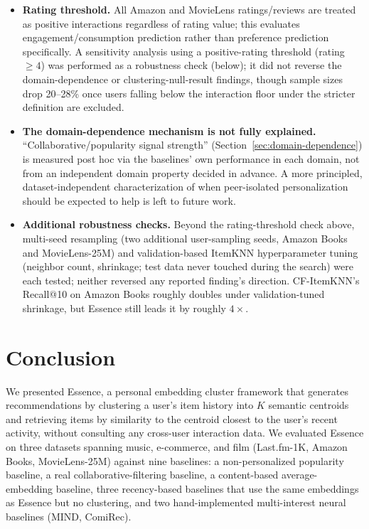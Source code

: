 \documentclass[11pt,a4paper]{article}
\begin{document}
\begin{itemize}[leftmargin=*, itemsep=3pt]
        both already outrank Essence substantially.
  \item \textbf{Rating threshold.} All Amazon and MovieLens
        ratings/reviews are treated as positive interactions regardless of
        rating value; this evaluates engagement/consumption prediction
        rather than preference prediction specifically. A sensitivity
        analysis using a positive-rating threshold (rating $\geq 4$) was
        performed as a robustness check (below); it did not reverse the
        domain-dependence or clustering-null-result findings, though
        sample sizes drop 20--28\% once users falling below the
        interaction floor under the stricter definition are excluded.
  \item \textbf{The domain-dependence mechanism is not fully explained.}
        ``Collaborative/popularity signal strength'' (Section~\ref{sec:domain-dependence})
        is measured post hoc via the baselines' own performance in each
        domain, not from an independent domain property decided in advance.
        A more principled, dataset-independent characterization of when
        peer-isolated personalization should be expected to help is left to
        future work.
  \item \textbf{Additional robustness checks.} Beyond the rating-threshold
        check above, multi-seed resampling (two additional user-sampling
        seeds, Amazon Books and MovieLens-25M) and validation-based
        ItemKNN hyperparameter tuning (neighbor count, shrinkage; test data
        never touched during the search) were each tested; neither
        reversed any reported finding's direction. CF-ItemKNN's Recall@10
        on Amazon Books roughly doubles under validation-tuned shrinkage,
        but Essence still leads it by roughly $4\times$.
\end{itemize}

\section{Conclusion}

We presented Essence, a personal embedding cluster framework that generates
recommendations by clustering a user's item history into $K$ semantic
centroids and retrieving items by similarity to the centroid closest to the
user's recent activity, without consulting any cross-user interaction data. We
evaluated Essence on three datasets spanning music, e-commerce, and film
(Last.fm-1K, Amazon Books, MovieLens-25M) against nine baselines: a
non-personalized popularity baseline, a real collaborative-filtering
baseline, a content-based average-embedding baseline, three recency-based
baselines that use the same embeddings as Essence but no clustering, and
two hand-implemented multi-interest neural baselines (MIND, ComiRec).
\end{document}
